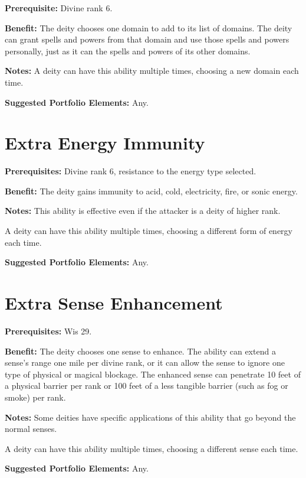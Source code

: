 \documentclass{article}
\begin{document}
\textbf{Prerequisite:} Divine rank 6.

\textbf{Benefit:} The deity chooses one domain to add to its list of domains. The 
deity can grant spells and powers from that domain and use those spells and powers 
personally, just as it can the spells and powers of its other domains.

\textbf{Notes:} A deity can have this ability multiple times, choosing a new domain 
each time.

\textbf{Suggested Portfolio Elements:} Any.

\vspace{12pt}
\section*{Extra Energy Immunity}

\textbf{Prerequisites:} Divine rank 6, resistance to the energy type selected.

\textbf{Benefit:} The deity gains immunity to acid, cold, electricity, fire, or 
sonic energy.

\textbf{Notes:} This ability is effective even if the attacker is a deity of higher 
rank.

A deity can have this ability multiple times, choosing a different form of energy 
each time.

\textbf{Suggested Portfolio Elements:} Any.

\vspace{12pt}
\section*{Extra Sense Enhancement}

\textbf{Prerequisites:} Wis 29.

\textbf{Benefit:} The deity chooses one sense to enhance. The ability can extend 
a sense's range one mile per divine rank, or it can allow the sense to ignore one 
type of physical or magical blockage. The enhanced sense can penetrate 10 feet 
of a physical barrier per rank or 100 feet of a less tangible barrier (such as 
fog or smoke) per rank.

\textbf{Notes:} Some deities have specific applications of this ability that go 
beyond the normal senses.

A deity can have this ability multiple times, choosing a different sense each time.

\textbf{Suggested Portfolio Elements:} Any.

\vspace{12pt}
\end{document}
